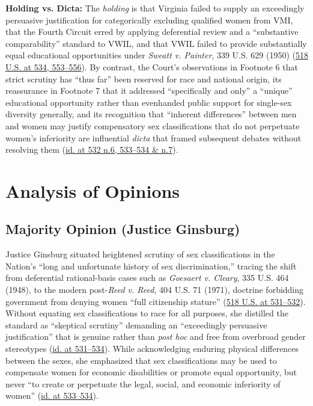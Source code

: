 \documentclass[12pt]{article}
\begin{document}
\textbf{Holding vs. Dicta:} The \textit{holding} is that Virginia failed to supply an exceedingly persuasive justification for categorically excluding qualified women from VMI, that the Fourth Circuit erred by applying deferential review and a ``substantive comparability'' standard to VWIL, and that VWIL failed to provide substantially equal educational opportunities under \textit{Sweatt v. Painter}, 339 U.S. 629 (1950) (\href{https://supreme.justia.com/cases/federal/us/518/515/}{518 U.S. at 534, 553--556}). By contrast, the Court's observations in Footnote 6 that strict scrutiny has ``thus far'' been reserved for race and national origin, its reassurance in Footnote 7 that it addressed ``specifically and only'' a ``unique'' educational opportunity rather than evenhanded public support for single-sex diversity generally, and its recognition that ``inherent differences'' between men and women may justify compensatory sex classifications that do not perpetuate women's inferiority are influential \textit{dicta} that framed subsequent debates without resolving them (\href{https://supreme.justia.com/cases/federal/us/518/515/}{id. at 532 n.6, 533--534 \& n.7}).

\section{Analysis of Opinions}

\subsection{Majority Opinion (Justice Ginsburg)}
Justice Ginsburg situated heightened scrutiny of sex classifications in the Nation's ``long and unfortunate history of sex discrimination,'' tracing the shift from deferential rational-basis cases such as \textit{Goesaert v. Cleary}, 335 U.S. 464 (1948), to the modern post-\textit{Reed v. Reed}, 404 U.S. 71 (1971), doctrine forbidding government from denying women ``full citizenship stature'' (\href{https://supreme.justia.com/cases/federal/us/518/515/}{518 U.S. at 531--532}). Without equating sex classifications to race for all purposes, she distilled the standard as ``skeptical scrutiny'' demanding an ``exceedingly persuasive justification'' that is genuine rather than \textit{post hoc} and free from overbroad gender stereotypes (\href{https://supreme.justia.com/cases/federal/us/518/515/}{id. at 531--534}). While acknowledging enduring physical differences between the sexes, she emphasized that sex classifications may be used to compensate women for economic disabilities or promote equal opportunity, but never ``to create or perpetuate the legal, social, and economic inferiority of women'' (\href{https://supreme.justia.com/cases/federal/us/518/515/}{id. at 533--534}).
\end{document}
